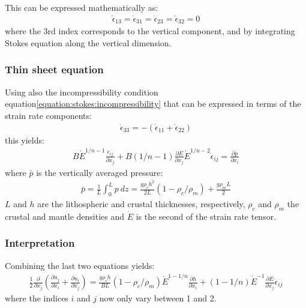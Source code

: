 \documentclass[letterpaper,10pt,english]{jupyterBook}
\begin{document}
\sphinxAtStartPar
This can be expressed mathematically as:
\begin{equation*}
\begin{split}\dot\epsilon_{13}=\dot\epsilon_{31}=\dot\epsilon_{23}=\dot\epsilon_{32}=0\end{split}
\end{equation*}
\sphinxAtStartPar
where the 3rd index corresponds to the vertical component, and by integrating Stokes equation along the vertical dimension.


\subsubsection{Thin sheet equation}
\label{\detokenize{approx:thin-sheet-equation}}
\sphinxAtStartPar
Using also the incompressibility condition \sphinxhyphen{} equation\eqref{equation:stokes:incompressibility} \sphinxhyphen{}  that can be expressed in terms of the strain rate components:
\begin{equation*}
\begin{split}\dot\epsilon_{33}=-(\dot\epsilon_{11}+\dot\epsilon_{22})\end{split}
\end{equation*}
\sphinxAtStartPar
this yields:
\begin{equation*}
\begin{split}B\dot E^{1/n-1}\frac{\dot\epsilon_{ij}}{\partial x_j}+B(1/n-1)\frac{\partial \dot E}{\partial x_j}\dot E^{1/n-2}\dot\epsilon_{ij}=\frac{\partial\bar p}{\partial x_i}\end{split}
\end{equation*}
\sphinxAtStartPar
where \(\bar p\) is the vertically averaged pressure:
\begin{equation*}
\begin{split}\bar p=\frac{1}{L}\int_0^L p\ dz=\frac{g\rho_ch^2}{2L}(1-\rho_c/\rho_m)+\frac{g\rho_mL}{2}\end{split}
\end{equation*}
\sphinxAtStartPar
\(L\) and \(h\) are the lithospheric and crustal thicknesses, respectively, \(\rho_c\) and \(\rho_m\) the crustal and mantle densities and \(\dot E\) is the second {\hyperref[\detokenize{glossary:term-Invariant}]{}} of the strain rate tensor.


\subsubsection{Interpretation}
\label{\detokenize{approx:interpretation}}
\sphinxAtStartPar
Combining the last two equations yields:
\begin{equation}\label{equation:approx:thinsheet}
\begin{split}\frac{1}{2}\frac{\partial}{\partial x_j}(\frac{\partial u_j}{\partial x_i}+\frac{\partial u_i}{\partial x_j})=\frac{g\rho_c h}{BL}(1-\rho_c/\rho_m)\dot E^{1-1/n}\frac{\partial h}{\partial x_i}+(1-1/n)\dot E^{-1}\frac{\partial\dot E}{\partial x_j}\dot\epsilon_{ij}\end{split}
\end{equation}
\sphinxAtStartPar
where the indices \(i\) and \(j\) now only vary between 1 and 2.
\end{document}

